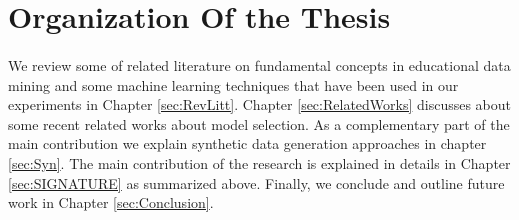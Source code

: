 \section{Organization Of the Thesis}
\paragraph{} We review some of related literature on fundamental concepts in educational data mining and some machine learning techniques that have been used in our experiments in Chapter \ref{sec:RevLitt}. Chapter \ref{sec:RelatedWorks} discusses about some recent related works about model selection. As a complementary part of the main contribution we explain synthetic data generation approaches in chapter \ref{sec:Syn}. The main contribution of the research is explained in details in Chapter \ref{sec:SIGNATURE} as summarized above. Finally, we conclude and outline future work in Chapter \ref{sec:Conclusion}. 


